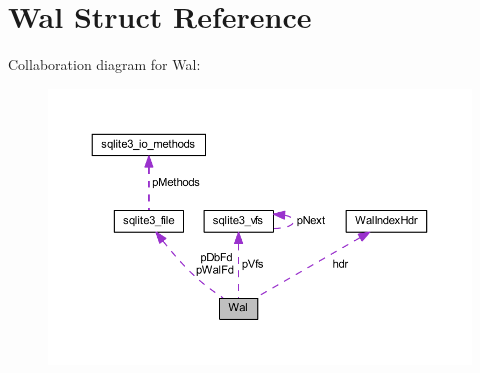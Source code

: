 \hypertarget{struct_wal}{\section{Wal Struct Reference}
\label{struct_wal}
}


Collaboration diagram for Wal\-:\nopagebreak
\begin{figure}[H]
\begin{center}
\leavevmode
\includegraphics[width=350pt]{struct_wal__coll__graph}
\end{center}
\end{figure}
